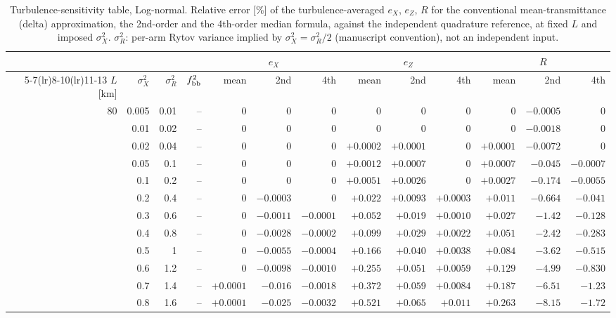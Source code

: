 \documentclass[11pt,a4paper]{article}
\begin{document}
\begin{table}[htbp]
\centering\scriptsize
\caption{Turbulence-sensitivity table, Log-normal. Relative error [\%] of the turbulence-averaged $e_X$, $e_Z$, $R$ for the conventional mean-transmittance (delta) approximation, the 2nd-order and the 4th-order median formula, against the independent quadrature reference, at fixed $L$ and imposed $\sigma_X^2$. $\sigma_R^2$: per-arm Rytov variance implied by $\sigma_X^2=\sigma_R^2/2$ (manuscript convention), not an independent input.}
\label{tab:sens-LN}
\begin{tabular}{rrrrrrrrrrrrr}
\toprule
 & & & & \multicolumn{3}{c}{$e_X$} & \multicolumn{3}{c}{$e_Z$} & \multicolumn{3}{c}{$R$}\\
\cmidrule(lr){5-7}\cmidrule(lr){8-10}\cmidrule(lr){11-13}
$L$ [km] & $\sigma_X^2$ & $\sigma_R^2$ & $f_{\rm bb}^2$ & mean & 2nd & 4th & mean & 2nd & 4th & mean & 2nd & 4th\\
\midrule
80 & 0.005 & 0.01 & -- & $0$ & $0$ & $0$ & $0$ & $0$ & $0$ & $0$ & $-0.0005$ & $0$ \\
 & 0.01 & 0.02 & -- & $0$ & $0$ & $0$ & $0$ & $0$ & $0$ & $0$ & $-0.0018$ & $0$ \\
 & 0.02 & 0.04 & -- & $0$ & $0$ & $0$ & $+0.0002$ & $+0.0001$ & $0$ & $+0.0001$ & $-0.0072$ & $0$ \\
 & 0.05 & 0.1 & -- & $0$ & $0$ & $0$ & $+0.0012$ & $+0.0007$ & $0$ & $+0.0007$ & $-0.045$ & $-0.0007$ \\
 & 0.1 & 0.2 & -- & $0$ & $0$ & $0$ & $+0.0051$ & $+0.0026$ & $0$ & $+0.0027$ & $-0.174$ & $-0.0055$ \\
 & 0.2 & 0.4 & -- & $0$ & $-0.0003$ & $0$ & $+0.022$ & $+0.0093$ & $+0.0003$ & $+0.011$ & $-0.664$ & $-0.041$ \\
 & 0.3 & 0.6 & -- & $0$ & $-0.0011$ & $-0.0001$ & $+0.052$ & $+0.019$ & $+0.0010$ & $+0.027$ & $-1.42$ & $-0.128$ \\
 & 0.4 & 0.8 & -- & $0$ & $-0.0028$ & $-0.0002$ & $+0.099$ & $+0.029$ & $+0.0022$ & $+0.051$ & $-2.42$ & $-0.283$ \\
 & 0.5 & 1 & -- & $0$ & $-0.0055$ & $-0.0004$ & $+0.166$ & $+0.040$ & $+0.0038$ & $+0.084$ & $-3.62$ & $-0.515$ \\
 & 0.6 & 1.2 & -- & $0$ & $-0.0098$ & $-0.0010$ & $+0.255$ & $+0.051$ & $+0.0059$ & $+0.129$ & $-4.99$ & $-0.830$ \\
 & 0.7 & 1.4 & -- & $+0.0001$ & $-0.016$ & $-0.0018$ & $+0.372$ & $+0.059$ & $+0.0084$ & $+0.187$ & $-6.51$ & $-1.23$ \\
 & 0.8 & 1.6 & -- & $+0.0001$ & $-0.025$ & $-0.0032$ & $+0.521$ & $+0.065$ & $+0.011$ & $+0.263$ & $-8.15$ & $-1.72$ \\

\end{tabular}
\end{table}
\end{document}
